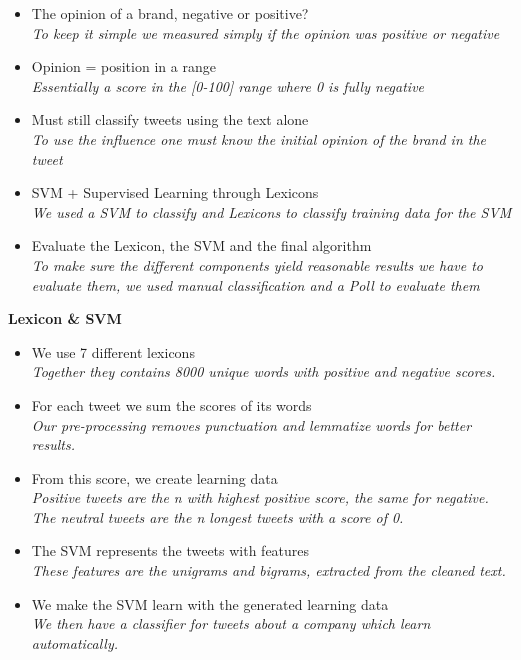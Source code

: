\documentclass[landscape,20pt]{extarticle}
\newcommand*{\TitleFont}{\Huge \bf}
\newcommand*{\TextFont}{\normalsize \it}
\begin{document}
\begin{itemize}
\item The opinion of a brand, negative or positive?\\
{\TextFont To keep it simple we measured simply if the opinion was positive or negative}
\item Opinion = position in a range\\
{\TextFont Essentially a score in the [0-100] range where 0 is fully negative}
\item Must still classify tweets using the text alone\\
{\TextFont To use the influence one must know the initial opinion of the brand in the tweet}
\item SVM + Supervised Learning through Lexicons\\
{\TextFont We used a SVM to classify and Lexicons to classify training data for the SVM}
\item Evaluate the Lexicon, the SVM and the final algorithm\\
{\TextFont To make sure the different components yield reasonable results we have to \\evaluate them, we used manual classification and a Poll to evaluate them}
\end{itemize}

\clearpage
\thispagestyle{empty}

{\TitleFont Lexicon \& SVM}

\begin{itemize}
\item We use 7 different lexicons\\
{\TextFont Together they contains 8000 unique words with positive and negative scores.}
\item For each tweet we sum the scores of its words\\
{\TextFont Our pre-processing removes punctuation and lemmatize words for better results.}
\item From this score, we create learning data\\
{\TextFont Positive tweets are the \textit{n} with highest positive score, the same for negative.\\
The neutral tweets are the \textit{n} longest tweets with a score of 0.}
\item The SVM represents the tweets with features\\
{\TextFont These features are the unigrams and bigrams, extracted from the cleaned text.}
\item We make the SVM learn with the generated learning data\\
{\TextFont We then have a classifier for tweets about a company which learn automatically.}
\end{itemize}
\end{document}
